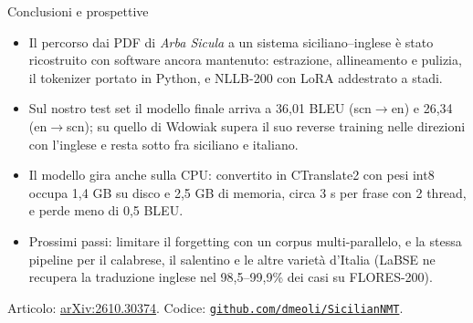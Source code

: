 \documentclass[aspectratio=169]{beamer}
\newcommand{\T}[2]{#2}
\newcommand{\T}[2]{#1}
\begin{document}
\begin{frame}{\T{Conclusion and outlook}{Conclusioni e prospettive}}
  \begin{itemize}
    \item \T{The path from the PDFs of \emph{Arba Sicula} to a Sicilian--English system was
          rebuilt on maintained software: extraction, alignment and cleaning, the tokenizer
          ported to Python, and NLLB-200 with LoRA trained in stages.}%
          {Il percorso dai PDF di \emph{Arba Sicula} a un sistema siciliano--inglese \`e stato ricostruito con software ancora mantenuto: estrazione, allineamento e pulizia, il tokenizer
          portato in Python, e NLLB-200 con LoRA addestrato a stadi.}
    \item \T{On our test set the final model reaches 36.01 BLEU (scn$\to$en) and 26.34
          (en$\to$scn); on Wdowiak's, it is above his reverse-training system in the directions
          that involve English and below it between Sicilian and Italian.}%
          {Sul nostro test set il modello finale arriva a 36,01 BLEU (scn$\to$en) e 26,34
          (en$\to$scn); su quello di Wdowiak supera il suo reverse training nelle direzioni con
          l'inglese e resta sotto fra siciliano e italiano.}
    \item \T{The model also runs on the CPU: converted to CTranslate2 with int8 weights it
          takes 1.4 GB on disk and 2.5 GB of memory, about 3 s per sentence with 2 threads, and
          loses less than 0.5 BLEU.}%
          {Il modello gira anche sulla CPU: convertito in CTranslate2 con pesi int8 occupa 1,4
          GB su disco e 2,5 GB di memoria, circa 3 s per frase con 2 thread, e perde meno di 0,5
          BLEU.}
    \item \T{Next: limiting the forgetting with a multi-parallel corpus, and the same pipeline
          for Calabrese, Salentino and the other varieties of Italy (LaBSE retrieves their
          English translation in 98.5--99.9\% of the cases on FLORES-200).}%
          {Prossimi passi: limitare il forgetting con un corpus multi-parallelo, e la stessa
          pipeline per il calabrese, il salentino e le altre variet\`a d'Italia (LaBSE ne
          recupera la traduzione inglese nel 98,5--99,9\% dei casi su FLORES-200).}
  \end{itemize}
  \vfill
  {\scriptsize \T{Paper:}{Articolo:} \href{https://arxiv.org/abs/2610.30374}{arXiv:2610.30374}. \T{Code:}{Codice:} \href{https://github.com/dmeoli/SicilianNMT}{\texttt{github.com/dmeoli/SicilianNMT}}.}
\end{frame}
\end{document}
